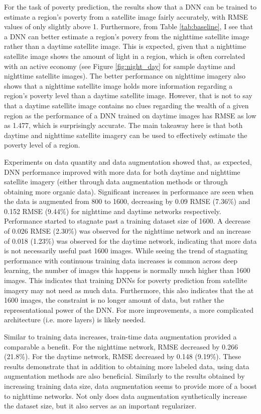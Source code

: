 \documentclass{article}
\begin{document}
For the task of poverty prediction, the results show that a DNN can be trained to estimate a region's poverty from a satellite image fairly accurately, with RMSE values of only slightly above 1. Furthermore, from Table \ref{tab:baseline}, I see that a DNN can better estimate a region's povery from the nighttime satellite image rather than a daytime satellite image. This is expected, given that a nighttime satellite image shows the amount of light in a region, which is often correlated with an active economy (see Figure \ref{fig:night_day} for sample daytime and nighttime satellite images). The better performance on nighttime imagery also shows that a nighttime satellite image holds more information regarding a region's poverty level than a daytime satellite image. However, that is not to say that a daytime satellite image contains no clues regarding the  wealth of a given region as the performance of a DNN trained on daytime images has RMSE as low as 1.477, which is surprisingly accurate. The main takeaway here is that both daytime and nighttime satellite imagery can be used to effectively estimate the poverty level of a region.

Experiments on data quantity and data augmentation showed that, as expected, DNN performance improved with more data for both daytime and nighttime satellite imagery (either through data augmentation methods or through obtaining more organic data). Significant increases in performance are seen when the data is augmented from 800 to 1600, decreasing by 0.09 RMSE (7.36\%) and 0.152 RMSE (9.44\%) for nighttime and daytime networks respectively. Performance started to stagnate past a training dataset size of 1600. A decrease of 0.026 RMSE (2.30\%) was observed for the nighttime network and an increase of 0.018 (1.23\%) was observed for the daytime network, indicating that more data is not necessarily useful past 1600 images. While seeing the trend of stagnating performance with continuous training data increases is common across deep learning, the number of images this happens is normally much higher than 1600 images. This indicates that training DNNs for poverty prediction from satellite imagery may not need as much data. Furthermore, this also indicates that the at 1600 images, the constraint is no longer amount of data, but rather the representational power of the DNN. For more improvements, a more complicated architecture (i.e. more layers) is likely needed.

Similar to training data increases, train-time data augmentation provided a comparable a benefit. For the nighttime network, RMSE decreased by 0.266 (21.8\%). For the daytime network, RMSE decreased by 0.148 (9.19\%). These results demonstrate that in addition to obtaining more labeled data, using data augmentation methods are also beneficial. Similarly to the results obtained by increasing training data size, data augmentation seems to provide more of a boost to nighttime networks. Not only does data augmentation synthetically increase the dataset size, but it also serves as an important regularizer.
\end{document}
